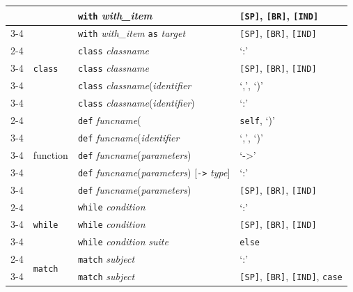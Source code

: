 \documentclass[letterpaper]{article} %
\theoremstyle{acmdefinition}
\begin{document}
\begin{table}[!t]
\begin{tabular}{m{2.8cm}m{2cm}m{6.5cm}m{5cm}}
        & & \texttt{with} \textit{with\_item}\text{:} & \texttt{[SP]}, \texttt{[BR]}, \texttt{[IND]} \\
        \cmidrule{3-4}

        & & \texttt{with} \textit{with\_item} \texttt{as} \textit{target}\text{:} & \texttt{[SP]}, \texttt{[BR]}, \texttt{[IND]} \\
        \cmidrule{2-4}

        & \multirow{3}{*}{\texttt{class}}  & \texttt{class} \textit{classname} & `:' \\
        \cmidrule{3-4}
        & & \texttt{class} \textit{classname}\text{:} & \texttt{[SP]}, \texttt{[BR]}, \texttt{[IND]}  \\
        \cmidrule{3-4}
        & & \texttt{class} \textit{classname}(\textit{identifier} &  `,', `)'  \\
        \cmidrule{3-4}
         & & \texttt{class} \textit{classname}(\textit{identifier}) &   `:'  \\
        \cmidrule{2-4}
        & \multirow{5}{*}{function} & \texttt{def} \textit{funcname}( & \texttt{self}, `)' \\
        \cmidrule{3-4}
        & & \texttt{def} \textit{funcname}(\textit{identifier} & `,', `)' \\
        \cmidrule{3-4}
        & & \texttt{def} \textit{funcname}(\textit{parameters}) &  `->' \\
        \cmidrule{3-4}
        & & \texttt{def} \textit{funcname}(\textit{parameters}) [\texttt{->} \textit{type}] & `:' \\
        \cmidrule{3-4}
        & & \texttt{def} \textit{funcname}(\textit{parameters})\text{:} & \texttt{[SP]}, \texttt{[BR]}, \texttt{[IND]}  \\
        \cmidrule{2-4}
        & \multirow{3}{*}{\texttt{while}} & \texttt{while} \textit{condition} & `:'\\
        \cmidrule{3-4}
        & & \texttt{while} \textit{condition}\text{:} & \texttt{[SP]}, \texttt{[BR]}, \texttt{[IND]}  \\
        \cmidrule{3-4}
        & & \texttt{while} \textit{condition}\text{:} \textit{suite}& \texttt{else}\\
        \cmidrule{2-4}
        & \multirow{2}{*}{\texttt{match}} & \texttt{match} \textit{subject} & `:' \\
        \cmidrule{3-4}
        & & \texttt{match} \textit{subject}\text{:} &\texttt{[SP]}, \texttt{[BR]}, \texttt{[IND]}, \texttt{case}  \\
        

\end{tabular}
\end{table}
\end{document}
